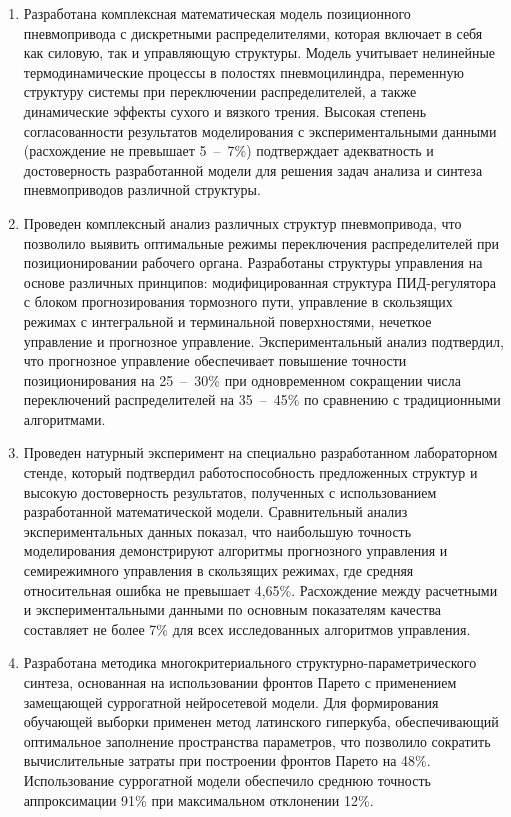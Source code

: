 \begin{enumerate}
	\item Разработана комплексная математическая модель позиционного пневмопривода с дискретными распределителями,
	      которая включает в себя как силовую, так и управляющую структуры. Модель учитывает нелинейные термодинамические
	      процессы в полостях пневмоцилиндра, переменную структуру системы при переключении распределителей, а также
	      динамические эффекты сухого и вязкого трения. Высокая степень согласованности результатов моделирования с
	      экспериментальными данными (расхождение не превышает 5~--~7\%) подтверждает адекватность и достоверность
	      разработанной модели для решения задач анализа и синтеза пневмоприводов различной структуры.

	\item Проведен комплексный анализ различных структур пневмопривода, что позволило выявить оптимальные
	      режимы переключения распределителей при позиционировании рабочего органа. Разработаны структуры управления
	      на основе различных принципов: модифицированная структура ПИД-регулятора с блоком прогнозирования тормозного пути,
	      управление в скользящих режимах с интегральной и терминальной поверхностями, нечеткое управление и прогнозное управление.
	      Экспериментальный анализ подтвердил, что прогнозное управление обеспечивает повышение точности позиционирования на 25~--~30\%
	      при одновременном сокращении числа переключений распределителей на 35~--~45\% по сравнению с традиционными алгоритмами.

	\item Проведен натурный эксперимент на специально разработанном лабораторном стенде, который подтвердил работоспособность
	      предложенных структур и высокую достоверность результатов, полученных с использованием разработанной математической модели.
	      Сравнительный анализ экспериментальных данных показал, что наибольшую точность моделирования демонстрируют алгоритмы прогнозного
	      управления и семирежимного управления в скользящих режимах, где средняя относительная ошибка не превышает 4,65\%.
	      Расхождение между расчетными и экспериментальными данными по основным показателям качества составляет
	      не более 7\% для всех исследованных алгоритмов управления.

	\item Разработана методика многокритериального структурно-\allowbreak па\-ра\-ме\-три\-че\-ско\-го синтеза, основанная
	      на использовании фронтов Парето с применением замещающей суррогатной нейросетевой модели. Для
	      формирования обучающей выборки применен метод латинского гиперкуба, обеспечивающий оптимальное
	      заполнение пространства параметров, что позволило сократить вычислительные затраты при построении
	      фронтов Парето на 48\%. Использование суррогатной модели обеспечило среднюю точность аппроксимации 91\%
	      при максимальном отклонении 12\%.


\end{enumerate}
